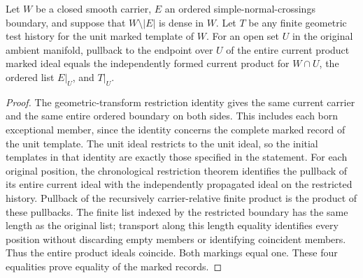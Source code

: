 \begin{theorem}
\label{hir:sharp-original-current-product-marked-open}
\leanok
Let $W$ be a closed smooth carrier, $E$ an ordered simple-normal-crossings
boundary, and suppose that $W\setminus |E|$ is dense in $W$. Let $T$ be any
finite geometric test history for the unit marked template of $W$. For an open
set $U$ in the original ambient manifold, pullback to the endpoint over $U$ of
the entire current product marked ideal equals the independently formed
current product for $W\cap U$, the ordered list $E|_U$, and $T|_U$.
\end{theorem}
\begin{proof}
The geometric-transform restriction identity gives the same current carrier
and the same entire ordered boundary on both sides. This includes each born
exceptional member, since the identity concerns the complete marked record of
the unit template. The unit ideal restricts to the unit ideal, so the initial
templates in that identity are exactly those specified in the statement.
For each original position, the chronological restriction theorem identifies
the pullback of its entire current ideal with the independently propagated
ideal on the restricted history. Pullback of the recursively carrier-relative
finite product is the product of these pullbacks. The finite list indexed by
the restricted boundary has the same length as the original list; transport
along this length equality identifies every position without discarding empty
members or identifying coincident members. Thus the entire product ideals
coincide. Both markings equal one. These four equalities prove equality of the
marked records.
\end{proof}


